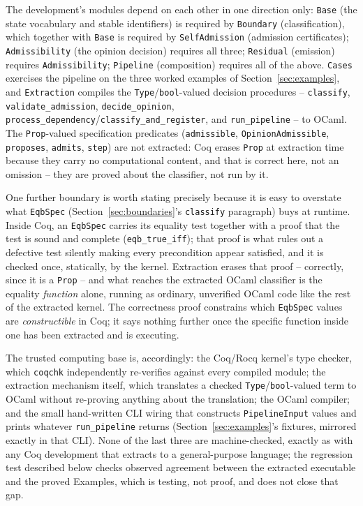 \documentclass[smallcondensed,envcountsect,natbib]{svjour3}
\begin{document}
The development's modules depend on each other in one direction only: \texttt{Base} (the state vocabulary and stable identifiers) is required by \texttt{Boundary} (classification), which together with \texttt{Base} is required by \texttt{SelfAdmission} (admission certificates); \texttt{Admissibility} (the opinion decision) requires all three; \texttt{Residual} (emission) requires \texttt{Admissibility}; \texttt{Pipeline} (composition) requires all of the above. \texttt{Cases} exercises the pipeline on the three worked examples of Section~\ref{sec:examples}, and \texttt{Extraction} compiles the \texttt{Type}/\texttt{bool}-valued decision procedures -- \texttt{classify}, \texttt{validate\_admission}, \texttt{decide\_opinion}, \texttt{process\_dependency}/\texttt{classify\_and\_register}, and \texttt{run\_pipeline} -- to OCaml. The \texttt{Prop}-valued specification predicates (\texttt{admissible}, \texttt{OpinionAdmissible}, \texttt{proposes}, \texttt{admits}, \texttt{step}) are not extracted: Coq erases \texttt{Prop} at extraction time because they carry no computational content, and that is correct here, not an omission -- they are proved about the classifier, not run by it.

One further boundary is worth stating precisely because it is easy to overstate what \texttt{EqbSpec} (Section~\ref{sec:boundaries}'s \texttt{classify} paragraph) buys at runtime. Inside Coq, an \texttt{EqbSpec} carries its equality test together with a proof that the test is sound and complete (\texttt{eqb\_true\_iff}); that proof is what rules out a defective test silently making every precondition appear satisfied, and it is checked once, statically, by the kernel. Extraction erases that proof -- correctly, since it is a \texttt{Prop} -- and what reaches the extracted OCaml classifier is the equality \emph{function} alone, running as ordinary, unverified OCaml code like the rest of the extracted kernel. The correctness proof constrains which \texttt{EqbSpec} values are \emph{constructible} in Coq; it says nothing further once the specific function inside one has been extracted and is executing.

The trusted computing base is, accordingly: the Coq/Rocq kernel's type checker, which \texttt{coqchk} independently re-verifies against every compiled module; the extraction mechanism itself, which translates a checked \texttt{Type}/\texttt{bool}-valued term to OCaml without re-proving anything about the translation; the OCaml compiler; and the small hand-written CLI wiring that constructs \texttt{PipelineInput} values and prints whatever \texttt{run\_pipeline} returns (Section~\ref{sec:examples}'s fixtures, mirrored exactly in that CLI). None of the last three are machine-checked, exactly as with any Coq development that extracts to a general-purpose language; the regression test described below checks observed agreement between the extracted executable and the proved Examples, which is testing, not proof, and does not close that gap.
\end{document}
